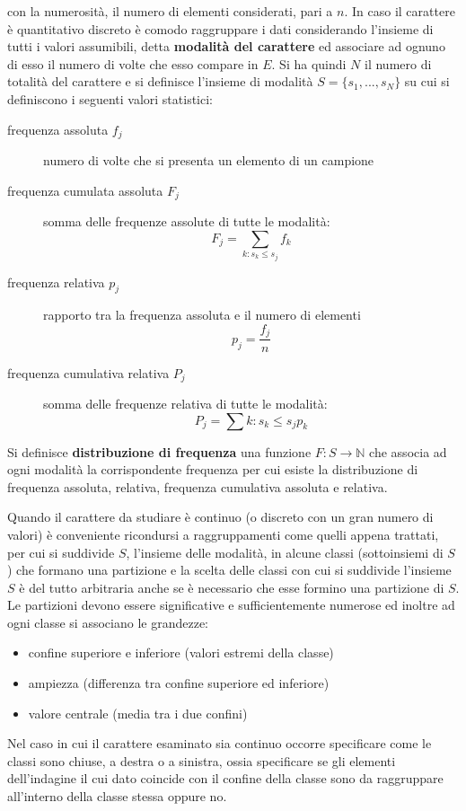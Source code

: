 \documentclass[a4paper,12pt, oneside]{book}
\newcommand{\numberset}{\mathbb}
\newcommand{\N}{\numberset{N}}
\begin{document}
con la numerosità, il numero di elementi considerati, pari a $n$. 
In caso il carattere è quantitativo discreto è comodo raggruppare i dati considerando 
l'insieme di tutti i valori assumibili, detta \textbf{modalità del carattere} ed associare ad ognuno 
di esso il numero di volte che esso compare in $E$.\newline
Si ha quindi $N$ il numero di totalità del carattere e si definisce l'insieme di modalità
$S=\{s_1,...,s_N\}$ su cui si definiscono i seguenti valori statistici:
\begin{description}
    \item [frequenza assoluta $f_j$] numero di volte che si presenta un elemento di un campione
    \item [frequenza cumulata assoluta $F_j$] somma delle frequenze assolute di tutte le modalità:
            \[ F_j = \sum_{k:s_k \leq s_j} f_k \]
    \item [frequenza relativa $p_j$] rapporto tra la frequenza assoluta e il numero di elementi 
            \[ p_j = \frac{f_j}{n} \]
    \item [frequenza cumulativa relativa $P_j$] somma delle frequenze relativa di tutte le modalità:
            \[ P_j = \sum{k:s_k \leq s_j} p_k \]
\end{description}
Si definisce \textbf{distribuzione di frequenza} una funzione $F:S \to \N$ che associa ad ogni modalità la corrispondente frequenza
per cui esiste la distribuzione di frequenza assoluta, relativa, frequenza cumulativa assoluta e relativa.

Quando il carattere da studiare è continuo (o discreto con un gran numero di valori) è conveniente 
ricondursi a raggruppamenti come quelli appena trattati, per cui si suddivide $S$, l'insieme delle modalità,
in alcune classi (sottoinsiemi di $S$) che formano una partizione e la scelta delle classi con cui 
si suddivide l'insieme $S$ è del tutto arbitraria anche se è necessario che esse formino una partizione di $S$.\newline
Le partizioni devono essere significative e sufficientemente numerose ed inoltre ad ogni classe si associano le grandezze:
\begin{itemize}
\item confine superiore e inferiore (valori estremi della classe)
\item ampiezza (differenza tra confine superiore ed inferiore)
\item valore centrale (media tra i due confini)
\end{itemize}
Nel caso in cui il carattere esaminato sia continuo occorre specificare come le classi sono chiuse, a destra o a sinistra,
ossia specificare se gli elementi dell'indagine il cui dato coincide con il confine della classe sono da raggruppare
all'interno della classe stessa oppure no.
\end{document}
